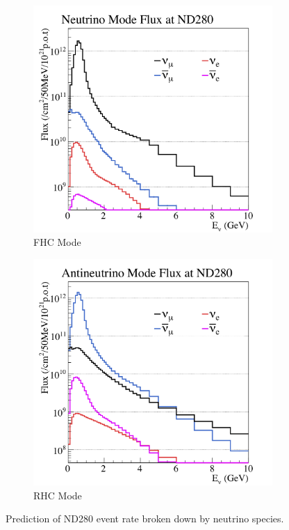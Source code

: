 \begin{figure}
\centering
\begin{subfigure}{.5\textwidth}
  \centering
  \includegraphics[width=.9\linewidth]{figs/nd5_alltunedflux_run1-9a_zoomed_13a}
  \caption{FHC Mode}
  \label{fig:fhcmode}
\end{subfigure}%
\begin{subfigure}{.5\textwidth}
  \centering
  \includegraphics[width=.9\linewidth]{figs/nd5_alltunedflux_run5c-9c_zoomed_antinu_13a}
  \caption{RHC Mode}
  \label{fig:rhcmode}
\end{subfigure}
\caption{Prediction of ND280 event rate broken down by neutrino species.}
\label{fig:modebreakdown}
\end{figure}

